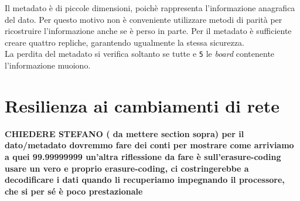 Il metadato \`{e} di piccole dimensioni, poich\`{e} rappresenta l'informazione anagrafica del dato. 
Per questo motivo non \`{e} conveniente utilizzare metodi di parit\`{a} per ricostruire l'informazione anche se \`{e} perso in parte.
Per il metadato \`{e} sufficiente creare quattro repliche, garantendo ugualmente la stessa sicurezza. \\
La perdita del metadato si verifica soltanto se tutte e \verb"5" le \textit{board} contenente l'informazione muoiono.



\section{Resilienza ai cambiamenti di rete}
\textbf{CHIEDERE STEFANO ( da mettere section sopra)
per il dato/metadato dovremmo fare dei conti per mostrare come arriviamo a quei 99.99999999%
un'altra riflessione da fare è sull'erasure-coding
usare un vero e proprio erasure-coding, ci costringerebbe a decodificare i dati quando li recuperiamo
impegnando il processore, che si per sé è poco prestazionale}